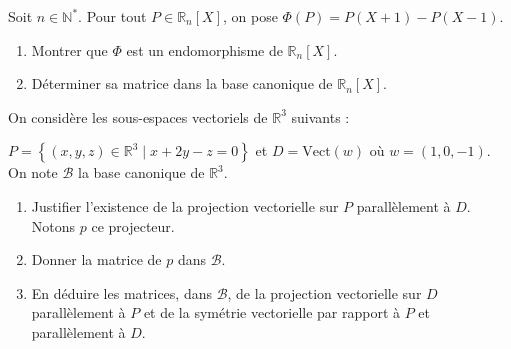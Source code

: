 \documentclass[a4paper,twoside,french,11pt]{VcCours}
\begin{document}
\begin{Exercice}{}
  Soit $n \in \mathbb{N}^*$. Pour tout $P \in \mathbb{R}_n[X]$, on pose $\Phi(P)=P(X+1)-P(X-1)$.
  
  \begin{enumerate}
    \item Montrer que $\Phi$ est un endomorphisme de $\mathbb{R}_n[X]$.
    \item Déterminer sa matrice dans la base canonique de $\mathbb{R}_n[X]$.
  \end{enumerate}
\end{Exercice} 

\begin{Exercice}{}
  On considère les sous-espaces vectoriels de $\mathbb{R}^3 $ suivants :
  
  $P = \left\{ {(x,y,z) \in \mathbb{R}^3 \mid x + 2y - z = 0} \right\}$ et $D = \textrm{Vect} (w){\text{ o\`u }}w = (1,0, - 1)$. On note $\mathcal{B}$ la base canonique de $\mathbb{R}^3 $.
  
  \begin{enumerate}
    \item Justifier l'existence de la projection vectorielle sur $P$ parallèlement à $D$. Notons $p$ ce projecteur.
    \item Donner la matrice de $p$ dans ${\mathcal{B}}$.
    \item En déduire les matrices, dans ${\mathcal{B}}$, de la projection vectorielle sur $D$ parallèlement à $P$ et de la symétrie vectorielle par rapport à $P$ et parallèlement à $D$.
  \end{enumerate}
\end{Exercice}
  
\end{document}
